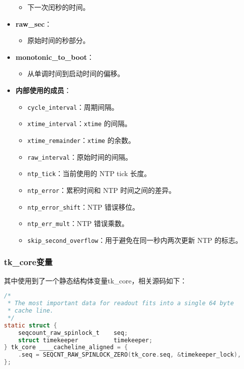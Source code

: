 \documentclass[12pt,hyperref,a4paper,UTF8]{ctexart}
\begin{document}
\begin{itemize}
\begin{itemize}
              \item 下一次闰秒的时间。
          \end{itemize}
    \item \textbf{raw\_sec}：
          \begin{itemize}
              \item 原始时间的秒部分。
          \end{itemize}
    \item \textbf{monotonic\_to\_boot}：
          \begin{itemize}
              \item 从单调时间到启动时间的偏移。
          \end{itemize}
    \item \textbf{内部使用的成员}：
          \begin{itemize}
              \item \lstinline|cycle_interval|：周期间隔。
              \item \lstinline|xtime_interval|：\lstinline|xtime| 的间隔。
              \item \lstinline|xtime_remainder|：\lstinline|xtime| 的余数。
              \item \lstinline|raw_interval|：原始时间的间隔。
              \item \lstinline|ntp_tick|：当前使用的 NTP tick 长度。
              \item \lstinline|ntp_error|：累积时间和 NTP 时间之间的差异。
              \item \lstinline|ntp_error_shift|：NTP 错误移位。
              \item \lstinline|ntp_err_mult|：NTP 错误乘数。
              \item \lstinline|skip_second_overflow|：用于避免在同一秒内两次更新 NTP 的标志。
          \end{itemize}
\end{itemize}

\subsubsection{tk\_core变量}

其中使用到了一个静态结构体变量tk\_core，相关源码如下：

\begin{lstlisting}[language=C]
/*
 * The most important data for readout fits into a single 64 byte
 * cache line.
 */
static struct {
    seqcount_raw_spinlock_t    seq;
    struct timekeeper          timekeeper;
} tk_core ____cacheline_aligned = {
    .seq = SEQCNT_RAW_SPINLOCK_ZERO(tk_core.seq, &timekeeper_lock),
};
\end{lstlisting}
\end{document}

